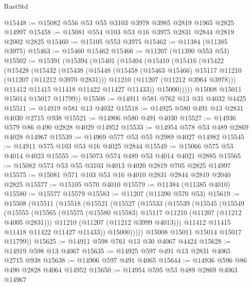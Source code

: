 \begin{lexlean}{RustStd}
\begin{coremodule}
@15448 := @15082 @556 @53 @55 @3103 @3978 @3985 @2819 @1965 @2825 @14997
@15458 := @15081 @554 @103 @53 @16 @3975 @2831 @2844 @2819 @2002 @2825
@15460 := @15105 @553 @3975
@15462 := @11384 (@11385 @3975)
@15463 := @15460 @15462
@15466 := @11207 (@11390 @553 @53)
@15502 := @15391
    (@15394
      (@15401
        (@15404
          (@15410
            (@15416
              (@15422
                (@15428
                  (@15432
                    (@15438
                      (@15448
                        (@15458 (@15463 @15466) @15117 @11210 (@11207 (@11212 @3970 @2831)))
                        @11210
                        (@11207 (@11212 @3964 @3978)))
                      @11412
                      @11415
                      @11418
                      @11422
                      @11427
                      @11433))
                  @15000)))))
        @15008
        @15011
        @15014
        @15017
        @11799))
@15508 := @14911 @581 @762 @13 @31 @4032 @4425
@15511 := @14919 @581 @13 @4032
@15518 := @14925 @580 @491 @13 @2831 @4030 @2715 @938
@15521 := @14906 @580 @491 @4030
@15527 := @14936 @579 @86 @490 @2828 @4029 @14952
@15533 := @14954 @578 @53 @489 @2869 @4028 @14967
@15539 := @14969 @577 @53 @55 @2989 @4027 @14982
@15545 := @14911 @575 @103 @53 @16 @4025 @2844
@15549 := @15066 @575 @53 @4014 @4023
@15555 := @15073 @574 @489 @53 @4014 @4021 @2885
@15565 := @15082 @573 @53 @55 @3103 @4013 @4020 @2819 @705 @2825 @14997
@15575 := @15081 @571 @103 @53 @16 @4010 @2831 @2844 @2819 @2040 @2825
@15577 := @15105 @570 @4010
@15579 := @11384 (@11385 @4010)
@15580 := @15577 @15579
@15583 := @11207 (@11390 @570 @53)
@15619 := @15508
    (@15511
      (@15518
        (@15521
          (@15527
            (@15533
              (@15539
                (@15545
                  (@15549
                    (@15555
                      (@15565
                        (@15575 (@15580 @15583) @15117 @11210 (@11207 (@11212 @4005 @2831)))
                        @11210
                        (@11207 (@11212 @3999 @4013)))
                      @11412
                      @11415
                      @11418
                      @11422
                      @11427
                      @11433))
                  @15000)))))
        @15008
        @15011
        @15014
        @15017
        @11799))
@15625 := @14911 @598 @761 @13 @30 @4067 @4424
@15628 := @14919 @598 @13 @4067
@15635 := @14925 @597 @491 @13 @2831 @4065 @2715 @938
@15638 := @14906 @597 @491 @4065
@15644 := @14936 @596 @86 @490 @2828 @4064 @14952
@15650 := @14954 @595 @53 @489 @2869 @4063 @14967

\end{coremodule}
\end{lexlean}
